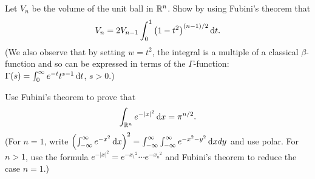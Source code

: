\begin{problem}
  Let $V_n$ be the volume of the unit ball in $\mathbb{R}^n$. Show by using
  Fubini's theorem that
  \[
    V_n=2V_{n-1}\int_0^1\left(1-t^2\right)^{(n-1)/2}\mathop{}\!\mathrm{d} t.
  \]
  (We also observe that by setting $w=t^2$, the integral is a multiple of a
  classical $\beta$-function and so can be expressed in terms of the
  $\Gamma$-function: $\Gamma(s)=\int_0^\infty e^{-t}t^{s-1}\mathop{}\!\mathrm{d} t$,
  $s>0$.)
\end{problem}
\begin{solution}
\end{solution}

\begin{problem}
  Use Fubini's theorem to prove that
  \[
    \int_{\mathbb{R}^n}e^{-| x |^2}\mathop{}\!\mathrm{d} x =\pi^{n/2}.
  \]
  (For $n=1$, write
  $\left(\int_{-\infty}^\infty e^{-x^2}\mathop{}\!\mathrm{d}
    x\right)^2=\int_{-\infty}^\infty\int_{-\infty}^\infty e^{-x^2-y^2}\mathop{}\!\mathrm{d}
  xdy$ and use polar. For $n>1$, use the formula
  $e^{-| x |^2}=e^{-{x_1}^2}\cdots e^{-{x_n}^2}$ and Fubini's theorem to
  reduce the case $n=1$.)
\end{problem}
\begin{solution}
\end{solution}

